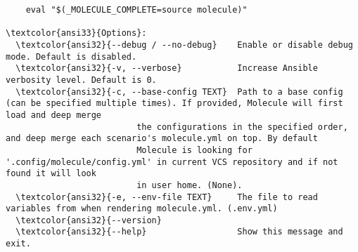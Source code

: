 \documentclass{scrartcl}
\begin{document}
\begin{Verbatim}
    eval "$(_MOLECULE_COMPLETE=source molecule)"

\textcolor{ansi33}{Options}:
  \textcolor{ansi32}{--debug / --no-debug}    Enable or disable debug mode. Default is disabled.
  \textcolor{ansi32}{-v, --verbose}           Increase Ansible verbosity level. Default is 0.
  \textcolor{ansi32}{-c, --base-config TEXT}  Path to a base config (can be specified multiple times). If provided, Molecule will first load and deep merge
                          the configurations in the specified order, and deep merge each scenario's molecule.yml on top. By default
                          Molecule is looking for '.config/molecule/config.yml' in current VCS repository and if not found it will look
                          in user home. (None).
  \textcolor{ansi32}{-e, --env-file TEXT}     The file to read variables from when rendering molecule.yml. (.env.yml)
  \textcolor{ansi32}{--version}
  \textcolor{ansi32}{--help}                  Show this message and exit.


\end{Verbatim}
\end{document}
